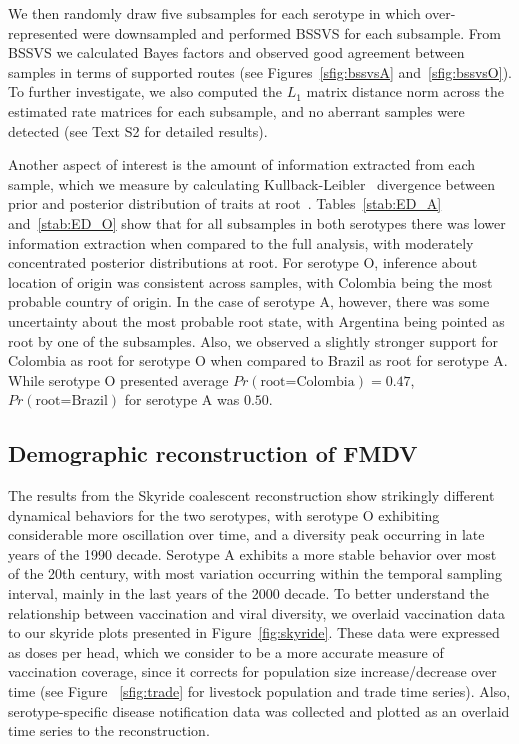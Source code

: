 \documentclass[10pt]{article}
\begin{document}
We then randomly draw five subsamples for each serotype in which over-represented were downsampled and performed BSSVS for each subsample.
From BSSVS we calculated Bayes factors and observed good agreement between samples in terms of supported routes (see Figures~\ref{sfig:bssvsA} and~\ref{sfig:bssvsO}).
To further investigate, we also computed the $L_1$ matrix distance norm across the estimated rate matrices for each subsample, and no aberrant samples were detected (see Text S2 for detailed results).

Another aspect of interest is the amount of information extracted from each sample, which we measure by calculating Kullback-Leibler~\cite{KL} divergence between prior and posterior distribution of traits at root~\cite{roots}.
Tables~\ref{stab:ED_A} and~\ref{stab:ED_O} show that for all subsamples in both serotypes there was lower information extraction when compared to the full analysis, with moderately concentrated posterior distributions at root.
For serotype O, inference about location of origin was consistent across samples, with Colombia being the most probable country of origin.
In the case of serotype A, however, there was some uncertainty about the most probable root state, with Argentina being pointed as root by one of the subsamples.
Also, we observed a slightly stronger support for Colombia as root for serotype O when compared to Brazil as root for serotype A.
While serotype O presented average $Pr(\text{root=Colombia})=0.47$, $Pr(\text{root=Brazil})$ for serotype A was $0.50$.

\subsection*{Demographic reconstruction of FMDV}

The results from the Skyride coalescent reconstruction show strikingly different dynamical behaviors for the two serotypes, with serotype O exhibiting considerable more oscillation over time, and a diversity peak occurring in late years of the 1990 decade.
Serotype A exhibits a more stable behavior over most of the 20th century, with most variation occurring within the temporal sampling interval, mainly in the last years of the 2000 decade.
To better understand the relationship between vaccination and viral diversity, we overlaid vaccination data to our skyride plots presented in Figure~\ref{fig:skyride}.
These data were expressed as doses per head, which we consider to be a more accurate measure of vaccination coverage, since it corrects for population size increase/decrease over time (see Figure ~\ref{sfig:trade} for livestock population and trade time series). 
Also, serotype-specific disease notification data was collected and plotted as an overlaid time series to the reconstruction. 
\end{document}
